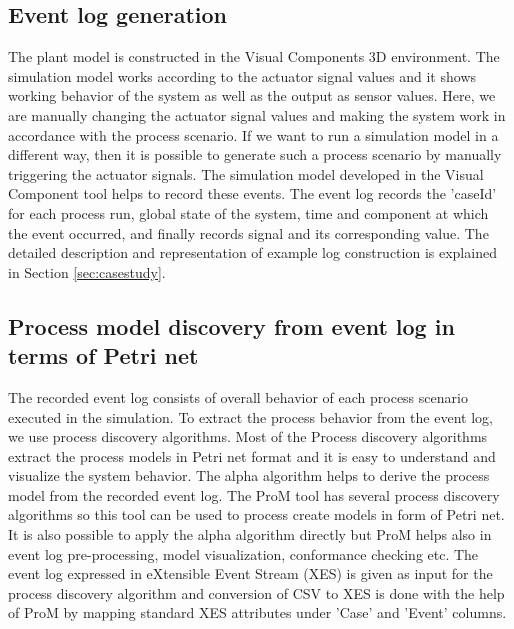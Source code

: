 \documentclass[conference]{IEEEtran}
\begin{document}
\subsection{Event log generation}
\label{subsec:eventlog_generation}
The plant model is constructed in the Visual Components 3D environment.  The simulation model works according to the actuator signal values and it shows working behavior of the system as well as the output as sensor values. Here, we are manually changing the actuator signal values and making the system work in accordance with the process scenario. If we want to run a simulation model in a different way, then it is possible to generate such a process scenario by manually triggering the actuator signals. The simulation model developed in the Visual Component tool helps to record these events. The event log records the ’caseId’ for each process run, global state of the system, time and component at which the event occurred, and finally records signal and its corresponding value. The detailed description and representation of example log construction is explained in Section \ref{sec:casestudy}.






\subsection{Process model discovery from event log in terms of Petri net}
\label{subsec:processdicovery}

The recorded event log consists of overall behavior of each process scenario executed in the simulation. To extract the process behavior from the event log, we use process discovery algorithms. Most of the Process discovery algorithms extract the process models in Petri net format \cite{van2013discovering} and it is easy to understand and visualize the system behavior. The alpha algorithm \cite{van2004workflow}  helps to derive the process model from the recorded event log. The ProM tool has several process discovery algorithms so this tool can be used to process create models in form of Petri net. It is also possible to apply the alpha algorithm directly but ProM  helps also in event log pre-processing, model visualization, conformance checking etc. The event log expressed in eXtensible Event Stream (XES) is given as input for the process discovery algorithm and conversion of CSV to XES is done with the help of ProM by mapping standard XES attributes under 'Case' and 'Event' columns.
\end{document}
